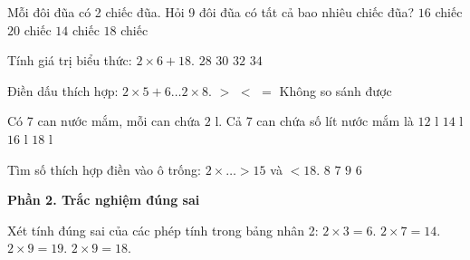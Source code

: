 \begin{ex} %
Mỗi đôi đũa có 2 chiếc đũa. Hỏi 9 đôi đũa có tất cả bao nhiêu chiếc đũa?
\choice
{$16$ chiếc}
{$20$ chiếc}
{$14$ chiếc}
{\True $18$ chiếc}
\end{ex}

\begin{ex} %
Tính giá trị biểu thức: $2 \times 6 + 18$.
\choice
{$28$}
{\True $30$}
{$32$}
{$34$}
\end{ex}

\begin{ex} %
Điền dấu thích hợp: $2 \times 5 + 6 \dots 2 \times 8$.
\choice
{$>$}
{$<$}
{\True $=$}
{Không so sánh được}
\end{ex}

\begin{ex} %
Có 7 can nước mắm, mỗi can chứa $2\text{ l}$. Cả 7 can chứa số lít nước mắm là
\choice
{$12\text{ l}$}
{\True $14\text{ l}$}
{$16\text{ l}$}
{$18\text{ l}$}
\end{ex}

\begin{ex} %
Tìm số thích hợp điền vào ô trống: $2 \times \dots > 15$ và $< 18$.
\choice
{\True $8$}
{$7$}
{$9$}
{$6$}
\end{ex}

\textbf{Phần 2. Trắc nghiệm đúng sai}

\begin{ex} %
Xét tính đúng sai của các phép tính trong bảng nhân 2:
\choiceTF
{\True $2 \times 3 = 6$.}
{\True $2 \times 7 = 14$.}
{$2 \times 9 = 19$.}
{\True $2 \times 9 = 18$.}
\end{ex}

